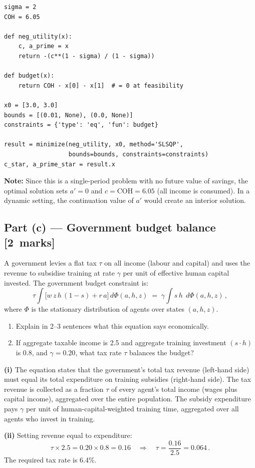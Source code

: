 \documentclass[11pt,a4paper]{article}
\newcommand{\mkpts}[1]{\hfill\textbf{[#1~marks]}}
\begin{document}
\begin{solution}
\begin{lstlisting}[numbers=none]
sigma = 2
COH = 6.05

def neg_utility(x):
    c, a_prime = x
    return -(c**(1 - sigma) / (1 - sigma))

def budget(x):
    return COH - x[0] - x[1]  # = 0 at feasibility

x0 = [3.0, 3.0]
bounds = [(0.01, None), (0.0, None)]
constraints = {'type': 'eq', 'fun': budget}

result = minimize(neg_utility, x0, method='SLSQP',
                  bounds=bounds, constraints=constraints)
c_star, a_prime_star = result.x
\end{lstlisting}

\textbf{Note:} Since this is a single-period problem with no future value of savings, the optimal solution sets $a' = 0$ and $c = \text{COH} = 6.05$ (all income is consumed).  In a dynamic setting, the continuation value of $a'$ would create an interior solution.
\end{solution}

\subsection*{Part (c) --- Government budget balance \mkpts{2}}

A government levies a flat tax $\tau$ on all income (labour and capital) and uses the revenue to subsidise training at rate $\gamma$ per unit of effective human capital invested.  The government budget constraint is:
\[
\tau \int \bigl[w\,z\,h\,(1-s) + r\,a\bigr]\,d\Phi(a,h,z) \;=\; \gamma \int s\,h\;\,d\Phi(a,h,z)\,,
\]
where $\Phi$ is the stationary distribution of agents over states $(a,h,z)$.

\begin{enumerate}[label=(\roman*),nosep]
\item Explain in 2--3 sentences what this equation says economically.
\item If aggregate taxable income is 2.5 and aggregate training investment $(s\cdot h)$ is 0.8, and $\gamma = 0.20$, what tax rate $\tau$ balances the budget?
\end{enumerate}

\begin{solution}
\textbf{(i)} The equation states that the government's total tax revenue (left-hand side) must equal its total expenditure on training subsidies (right-hand side).  The tax revenue is collected as a fraction $\tau$ of every agent's total income (wages plus capital income), aggregated over the entire population.  The subsidy expenditure pays $\gamma$ per unit of human-capital-weighted training time, aggregated over all agents who invest in training.

\medskip

\textbf{(ii)} Setting revenue equal to expenditure:
\[
\tau \times 2.5 = 0.20 \times 0.8 = 0.16 \quad\Longrightarrow\quad \tau = \frac{0.16}{2.5} = \boxed{0.064}\,.
\]
The required tax rate is 6.4\%.
\end{solution}
\end{document}
